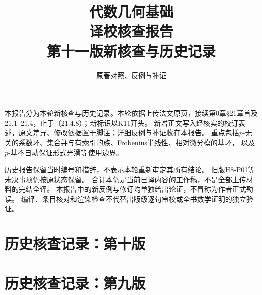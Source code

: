 
\newcommand{\RR}{\mathcal R}
\newcommand{\FF}{\mathcal F}
\newcommand{\GG}{\mathcal G}
\newcommand{\MM}{\mathcal M}
\newcommand{\JJ}{\mathcal J}
\newcommand{\oldauditsrc}[1]{\par\noindent\textbf{原文位置：}#1。\par}
\newcommand{\kind}[2]{\noindent\textbf{分类：#1。}\ #2\par}
\newcommand{\lead}[1]{\par\noindent\textbf{#1}\quad}
\newenvironment{analysisproof}{\par\noindent\textbf{该轮核查的反例或补证。}\ }{\par}

\title{代数几何基础\\译校核查报告\\[1em]\large 第十一版新核查与历史记录}
\author{原著对照、反例与补证}
\date{}

\frontmatter
\maketitle
{}
本报告分为本轮新核查与历史记录。本轮依据上传法文原页，接续第0章§21章首及21.1--21.4，止于（21.4.8）；新标识以K11开头。
新增正文写入经核实的校订表述，原文差异、修改依据置于脚注；详细反例与补证收在本报告。
重点包括$p$-无关的系数环、集合并与有索引的族、Frobenius半线性、相对微分模的基环，
以及$p$-基不自动保证形式光滑等使用边界。

历史报告保留当时编号和措辞，不表示本轮重新审定其所有结论。
旧版H8-P01等未决事项仍按原状态保留。
合订本仍是当前已译内容的工作稿，不是全部上传材料的完结全译。
本报告中的新反例与修订均单独给出论证，不冒称为作者正式勘误。
编译、条目核对和渲染检查不代替出版级逐句审校或全书数学证明的独立验证。
\tableofcontents
\mainmatter

\part*{历史核查记录：第十版}

\part*{历史核查记录：第九版}

